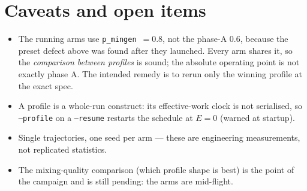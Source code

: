 \documentclass[11pt]{article}
\newcommand{\code}[1]{\texttt{#1}}
\begin{document}
\section{Caveats and open items}

\begin{itemize}
\item The running arms use \code{p\_mingen}~$=0.8$, not the phase-A
$0.6$, because the preset defect above was found after they launched. Every
arm shares it, so the \emph{comparison between profiles} is sound; the
absolute operating point is not exactly phase A. The intended remedy is to
rerun only the winning profile at the exact spec.
\item A profile is a whole-run construct: its effective-work clock is not
serialised, so \code{--profile} on a \code{--resume} restarts the schedule
at $E = 0$ (warned at startup).
\item Single trajectories, one seed per arm --- these are engineering
measurements, not replicated statistics.
\item The mixing-quality comparison (which profile shape is best) is the
point of the campaign and is still pending: the arms are mid-flight.
\end{itemize}
\end{document}
